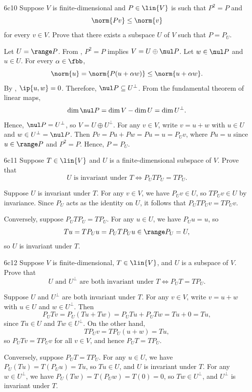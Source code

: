 \begin{exercise}{6c10}
    Suppose $V$ is finite-dimensional and $P \in \lin{V}$ is such that $P^2 = P$ and
    \[
        \norm{Pv} \leq \norm{v}
    \]
    for every $v \in V$.
    Prove that there exists a subspace $U$ of $V$ such that $P = P_U$.
\end{exercise}

\begin{sol}
    Let $U = \range P$.
    From , $P^2 = P$ implies $V = U \oplus \nul P$.
    Let $w \in \nul P$ and $u \in U$.
    For every $\alpha \in \fbb$,
    \[
        \norm{u} = \norm{P(u + \alpha w)} \leq \norm{u + \alpha w}.
    \]
    By , $\ip{u, w} = 0$.
    Therefore, $\nul P \subseteq U^\perp$.
    From the fundamental theorem of linear maps,
    \[
        \dim \nul P = \dim V - \dim U = \dim U^\perp.
    \]
    Hence, $\nul P = U^\perp$, so $V = U \oplus U^\perp$.
    For any $v \in V$, write $v = u + w$ with $u \in U$ and $w \in U^\perp = \nul P$.
    Then $Pv = Pu + Pw = Pu = u = P_U v$, where $Pu = u$ since $u \in \range P$ and $P^2 = P$.
    Hence, $P = P_U$.
\end{sol}

\begin{exercise}{6c11}
    Suppose $T \in \lin{V}$ and $U$ is a finite-dimensional subspace of $V$.
    Prove that
    \[
        U \text{ is invariant under } T \iff P_U T P_U = T P_U.
    \]
\end{exercise}

\begin{sol}
    Suppose $U$ is invariant under $T$. For any $v \in V$, we have $P_U v \in U$, so $T P_U v \in U$ by invariance.
    Since $P_U$ acts as the identity on $U$, it follows that $P_U T P_U v = T P_U v$.

    Conversely, suppose $P_U T P_U = T P_U$.
    For any $u \in U$, we have $P_U u = u$, so
    \[
        Tu = T P_U u = P_U T P_U u \in \range P_U = U,
    \]
    so $U$ is invariant under $T$.
\end{sol}

\begin{exercise}{6c12}
    Suppose $V$ is finite-dimensional, $T \in \lin{V}$, and $U$ is a subspace of $V$.
    Prove that
    \[
        U \text{ and } U^\perp \text{ are both invariant under } T \iff P_U T = T P_U.
    \]
\end{exercise}

\begin{sol}
    Suppose $U$ and $U^\perp$ are both invariant under $T$.
    For any $v \in V$, write $v = u + w$ with $u \in U$ and $w \in U^\perp$.
    Then
    \[
        P_U T v = P_U(Tu + Tw) = P_U Tu + P_U Tw = Tu + 0 = Tu,
    \]
    since $Tu \in U$ and $Tw \in U^\perp$.
    On the other hand,
    \[
        T P_U v = T P_U(u + w) = Tu,
    \]
    so $P_U T v = T P_U v$ for all $v \in V$, and hence $P_U T = T P_U$.

    Conversely, suppose $P_U T = T P_U$.
    For any $u \in U$, we have $P_U(Tu) = T(P_U u) = Tu$, so $Tu \in U$,
    and $U$ is invariant under $T$.
    For any $w \in U^\perp$, we have $P_U(Tw) = T(P_U w) = T(0) = 0$, so $Tw \in U^\perp$,
    and $U^\perp$ is invariant under $T$.
\end{sol}

